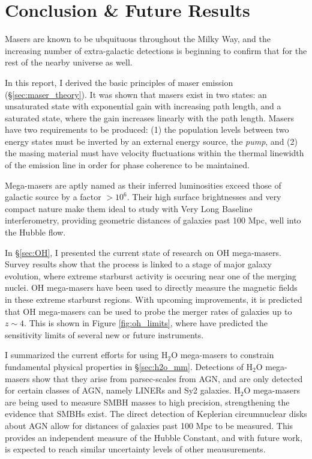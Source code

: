 \section{Conclusion \& Future Results}
\label{sec:conclusion}

Masers are known to be ubquituous throughout the Milky Way, and the increasing number of extra-galactic detections is beginning to confirm that for the rest of the nearby universe as well. 

In this report, I derived the basic principles of maser emission (\S\ref{sec:maser_theory}). It was shown that masers exist in two states: an unsaturated state with exponential gain with increasing path length, and a saturated state, where the gain increases linearly with the path length. Masers have two requirements to be produced: (1) the population levels between two energy states must be inverted by an external energy source, the {\it pump}, and (2) the masing material must have velocity fluctuations within the thermal linewidth of the emission line in order for phase coherence to be maintained.

Mega-masers are aptly named as their inferred luminosities exceed those of galactic source by a factor $\gt 10^6$. Their high surface brightnesses and very compact nature make them ideal to study with Very Long Baseline interferometry, providing geometric distances of galaxies past 100 Mpc, well into the Hubble flow.

In  \S\ref{sec:OH}, I presented the current state of research on OH mega-masers. Survey results show that the process is linked to a stage of major galaxy evolution, where extreme starburst activity is occuring near one of the merging nuclei. OH mega-masers have been used to directly measure the magnetic fields in these extreme starburst regions. With upcoming improvements, it is predicted that OH mega-masers can be used to probe the merger rates of galaxies up to $z\sim4$. This is shown in Figure \ref{fig:oh_limits}, where \citet{darling2002_lumfunc} have predicted the sensitivity limits of several new or future instruments. 

I summarized the current efforts for using H$_2$O mega-masers to constrain fundamental physical properties in \S\ref{sec:h2o_mm}. Detections of H$_2$O mega-masers show that they arise from parsec-scales from AGN, and are only detected for certain classes of AGN, namely LINERs and Sy2 galaxies. H$_2$O mega-masers are being used to measure SMBH masses to high precision, strengthening the evidence that SMBHs exist. The direct detection of Keplerian circumnuclear disks about AGN allow for distances of galaxies past 100 Mpc to be measured. This provides an independent measure of the Hubble Constant, and with future work, is expected to reach similar uncertainty levels of other meausurements.

